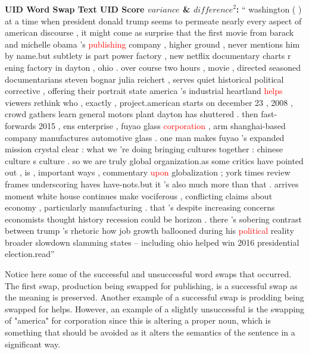 \documentclass{article}
\begin{document}
 \hfill \break \textbf{UID Word Swap Text UID Score $variance$ \& ${difference}^2$:} “ washington ( ) at a time when president donald trump seems to permeate nearly every aspect of american discourse , it might come as surprise that the first movie from barack and michelle obama 's \textcolor{red}{publishing} company , higher ground , never mentions him by name.but subtlety is part power factory , new netflix documentary charts r ening factory in dayton , ohio . over course two hours , movie , directed seasoned documentarians steven bognar julia reichert , serves quiet historical political corrective , offering their portrait state america 's industrial heartland \textcolor{red}{helps} viewers rethink who , exactly , project.american starts on december 23 , 2008 , crowd gathers learn general motors plant dayton has shuttered . then fast-forwards 2015 , ens enterprise , fuyao glass \textcolor{red}{corporation} , arm shanghai-based company manufactures automotive glass . one man makes fuyao 's expanded mission crystal clear : what we 're doing bringing cultures together : chinese culture s culture . so we are truly global organization.as some critics have pointed out , is , important ways , commentary \textcolor{red}{upon} globalization ; york times review frames underscoring haves have-nots.but it 's also much more than that . arrives moment white house continues make vociferous , conflicting claims about economy , particularly manufacturing . that 's despite increasing concerns economists thought history recession could be horizon . there 's sobering contrast between trump 's rhetoric how job growth ballooned during his \textcolor{red}{political} reality broader slowdown slamming states -- including ohio helped win 2016 presidential election.read”

 \hfill \break Notice here some of the successful and unsuccessful word swaps that occurred.  The first swap, production being swapped for publishing, is a successful swap as the meaning is preserved. Another example of a successful swap is prodding being swapped for helps. However, an example of a slightly unsuccessful is the swapping of "america" for corporation since this is altering a proper noun, which is something that should be avoided as it alters the semantics of the sentence in a significant way.
\end{document}
